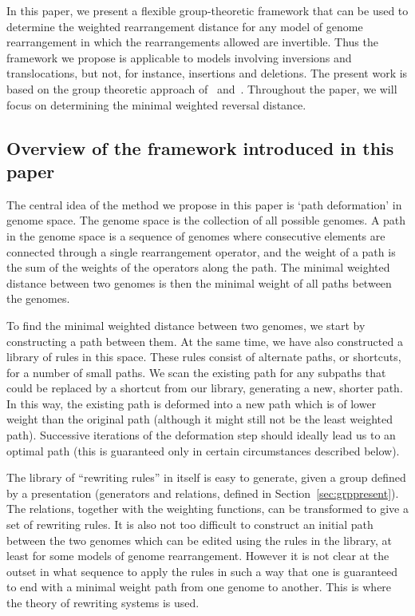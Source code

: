 \documentclass[utf8]{Frontiers_LaTex_Templates/frontiersFPHY} %
\numberwithin{equation}{section}
\begin{document}
In this paper, we present a flexible group-theoretic framework that can be used to determine the weighted rearrangement distance for any model of genome rearrangement in which the rearrangements allowed are invertible.  Thus the framework we propose is applicable to models involving inversions and translocations, but not, for instance, insertions and deletions.  The present work is based on the group theoretic approach of~\citet{egrinagy2013group} and~\citet{francis2014algebraic}. Throughout the paper, we will focus on determining the minimal weighted reversal distance.



\subsection*{Overview of the framework introduced in this paper}

The central idea of the method we propose in this paper is `path deformation' in genome space.  The genome space is the collection of all possible genomes. A path in the genome space is a sequence of genomes where consecutive elements are connected through a single rearrangement operator, and the weight of a path is the sum of the weights of the operators along the path. The minimal weighted distance between two genomes is then the minimal weight of all paths between the genomes. 

To find the minimal weighted distance between two genomes, we start by constructing a path between them.  At the same time, we have also constructed a library of rules in this space. These rules consist of alternate paths, or shortcuts, for a number of small paths. We scan the existing path for any subpaths that could be replaced by a shortcut from our library, generating a new, shorter path. In this way, the existing path is deformed into a new path which is of lower weight than the original path (although it might still not be the least weighted path). Successive iterations of the deformation step should ideally lead us to an optimal path (this is guaranteed only in certain circumstances described below).

The library of ``rewriting rules'' in itself is easy to generate, given a group defined by a presentation (generators and relations, defined in Section~\ref{sec:grppresent}).  The relations, together with the weighting functions, can be transformed to give a set of rewriting rules.  It is also not too difficult to construct an initial path between the two genomes which can be edited using the rules in the library, at least for some models of genome rearrangement. However it is not clear at the outset in what sequence to apply the rules in such a way that one is guaranteed to end with a minimal weight path from one genome to another. This is where the theory of rewriting systems is used.  
\end{document}
